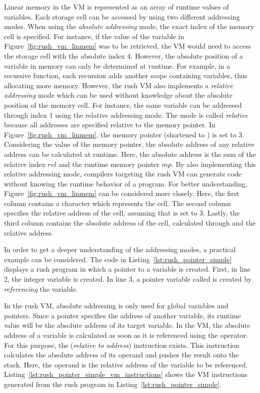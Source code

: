Linear memory in the VM is represented as an array of runtime values of variables.
Each storage cell can be accessed by using two different addressing modes.
When using the \emph{absolute addressing} mode, the exact index of the memory cell is specified.
For instance, if the value of the variable  in Figure~\ref{fig:rush_vm_linmem} was to be retrieved,
the VM would need to access the storage cell with the absolute index 4.
However, the absolute position of a variable in memory can only be determined at runtime.
For example, in a recursive function, each recursion adds another scope containing variables, thus allocating more memory.
However, the rush VM also implements a \emph{relative addressing} mode which can be used without knowledge about the absolute position of the memory cell.
For instance, the same variable can be addressed through index 1 using the relative addressing mode.
The mode is called \emph{relative} because all addresses are specified relative to the memory pointer.
In Figure~\ref{fig:rush_vm_linmem}, the memory pointer (shortened to ) is set to 3.
Considering the value of the memory pointer, the absolute address of any relative address can be calculated at runtime.
Here, the absolute address is the sum of the relative index $rel$ and the runtime memory pointer $mp$.
By also implementing this relative addressing mode,
compilers targeting the rush VM can generate code without knowing the runtime behavior of a program.
For better understanding, Figure~\ref{fig:rush_vm_linmem} can be considered more closely.
Here, the first column contains a character which represents the cell.
The second column specifies the relative address of the cell, assuming that  is set to 3.
Lastly, the third column contains the absolute address of the cell, calculated through  and the relative address.

In order to get a deeper understanding of the addressing modes, a practical example can be considered.
The code in Listing~\ref{lst:rush_pointer_simple} displays a rush program in which a pointer to a variable is created.
First, in line 2, the integer variable  is created.
In line 3, a pointer variable called  is created by \emph{referencing} the  variable.


In the rush VM, absolute addressing is only used for global variables and pointers.
Since a pointer specifies the address of another variable, its runtime value will be the absolute address of its target variable.
In the VM, the absolute address of a variable is calculated as soon as it is referenced using the \qVerb{&} operator.
For this purpose, the  (\emph{relative to address}) instruction exists.
This instruction calculates the absolute address of its operand and pushes the result onto the stack.
Here, the operand is the relative address of the variable to be referenced.
Listing~\ref{lst:rush_pointer_simple_vm_instructions} shows the VM instructions generated from the rush program in Listing~\ref{lst:rush_pointer_simple}.

